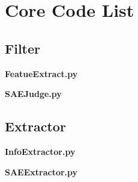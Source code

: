 \chapter{Core Code List}

\section{Filter}\label{apdx:filter}
\noindent \textbf{FeatueExtract.py}


\noindent \textbf{SAEJudge.py}


\section{Extractor}\label{apdx:extractor}
\noindent \textbf{InfoExtractor.py}


\noindent \textbf{SAEExtractor.py}
